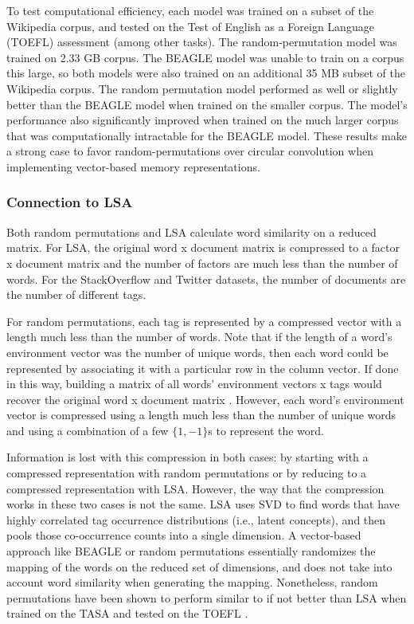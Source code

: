 \documentclass[man,floatsintext,donotrepeattitle]{apa6}
\begin{document}
To test computational efficiency, each model was trained on a subset of the Wikipedia corpus, and tested on the Test of English as a Foreign Language (TOEFL) assessment (among other tasks).
The random-permutation model was trained on \num{2.33} GB corpus.
The BEAGLE model was unable to train on a corpus this large, so both models were also trained on an additional \num{35} MB subset of the Wikipedia corpus.
The random permutation model performed as well or slightly better than the BEAGLE model when trained on the smaller corpus.
The model's performance also significantly improved when trained on the much larger corpus that was computationally intractable for the BEAGLE model.
These results make a strong case to favor random-permutations over circular convolution when implementing vector-based memory representations.

\subsubsection{Connection to LSA}

Both random permutations and LSA calculate word similarity on a reduced matrix.
For LSA, the original word x document matrix is compressed to a factor x document matrix and the number of factors are much less than the number of words.
For the StackOverflow and Twitter datasets, the number of documents are the number of different tags.

For random permutations, each tag is represented by a compressed vector with a length much less than the number of words.
Note that if the length of a word's environment vector was the number of unique words, then each word could be represented by associating it with a particular row in the column vector.
If done in this way, building a matrix of all words' environment vectors x tags would recover the original word x document matrix \parencite{Kanerva2000}.
However, each word's environment vector is compressed using a length much less than the number of unique words and using a combination of a few $\{1,-1\}$s to represent the word.

Information is lost with this compression in both cases: by starting with a compressed representation with random permutations or by reducing to a compressed representation with LSA.
However, the way that the compression works in these two cases is not the same.
LSA uses SVD to find words that have highly correlated tag occurrence distributions (i.e., latent concepts), and then pools those co-occurrence counts into a single dimension.
A vector-based approach like BEAGLE or random permutations essentially randomizes the mapping of the words on the reduced set of dimensions, and does not take into account word similarity when generating the mapping.
Nonetheless, random permutations have been shown to perform similar to if not better than LSA when trained on the TASA and tested on the TOEFL \parencites{Sahlgren2008,Jones2007}.
\end{document}
